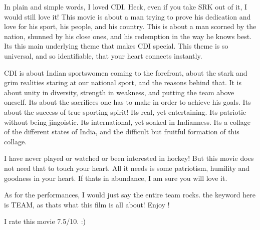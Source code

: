 \documentclass[]{article}
\begin{document}
In plain and simple words, I loved CDI. Heck, even if you take SRK out of it, I would still love it! This movie is about a man trying to prove his dedication and love for his sport, his people, and his country. This is about a man scorned by the nation, shunned by his close ones, and his redemption in the way he knows best. Its this main underlying theme that makes CDI special. This theme is so universal, and so identifiable, that your heart connects instantly.

CDI is about Indian sportswomen coming to the forefront, about the stark and grim realities staring at our national sport, and the reasons behind that. It is about unity in diversity, strength in weakness, and putting the team above oneself. Its about the sacrifices one has to make in order to achieve his goals. Its about the success of true sporting spirit! Its real, yet entertaining. Its patriotic without being jingoistic. Its international, yet soaked in Indianness. Its a collage of the different states of India, and the difficult but fruitful formation of this collage.

I have never played or watched or been interested in hockey! But this movie does not need that to touch your heart. All it needs is some patriotism, humility and goodness in your heart. If thats in abundance, I am sure you will love it.

As for the performances, I would just say the entire team rocks. the keyword here is TEAM, as thats what this film is all about! Enjoy !


I rate this movie 7.5/10. :)
\end{document}
